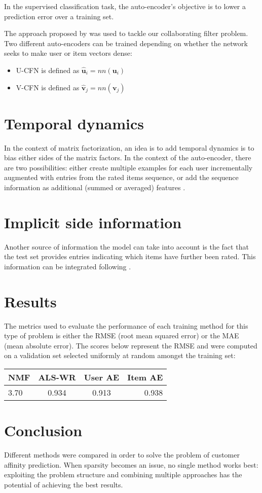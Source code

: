 \documentclass[10pt,twocolumn]{article}
\begin{document}
In the supervised classification task, the auto-encoder's objective is to lower a prediction error over a training set.

The approach proposed by \cite{strub2016hybrid} was used to tackle our collaborating filter problem. Two different auto-encoders can be trained depending on whether the network seeks to make user or item vectors dense:
\begin{itemize}
\item U-CFN is defined as $\hat{\textbf{u}}_i = nn(\textbf{u}_i)$
\item V-CFN is defined as $\hat{\textbf{v}}_j = nn(\textbf{v}_j)$ 
\end{itemize}

\section{Temporal dynamics}
In the context of matrix factorization, an idea is to add temporal dynamics is to bias either sides of the matrix factors. In the context of the auto-encoder, there are two possibilities: either create multiple examples for each user incrementally augmented with entries from the rated items sequence, or add the sequence information as additional (summed or averaged) features \cite{youtube2016}.

\section{Implicit side information}
Another source of information the model can take into account is the fact that the test set provides entries indicating which items have further been rated. This information can be integrated following \cite{salakhutdinov2007restricted}.

\section{Results}
The metrics used to evaluate the performance of each training method for this type of problem is either the RMSE (root mean squared error) or the MAE (mean absolute error). The scores below represent the RMSE and were computed on a validation set selected uniformly at random amongst the training set:
\begin{tabular}{|l|c|c|r|}
  \hline
  NMF & ALS-WR & User AE & Item AE \\
  \hline
  3.70 & 0.934 & 0.913 & 0.938 \\
  \hline
\end{tabular}


\section{Conclusion}
Different methods were compared in order to solve the problem of customer affinity prediction. When sparsity becomes an issue, no single method works best: exploiting the problem structure and combining multiple approaches has the potential of achieving the best results.


\end{document}
